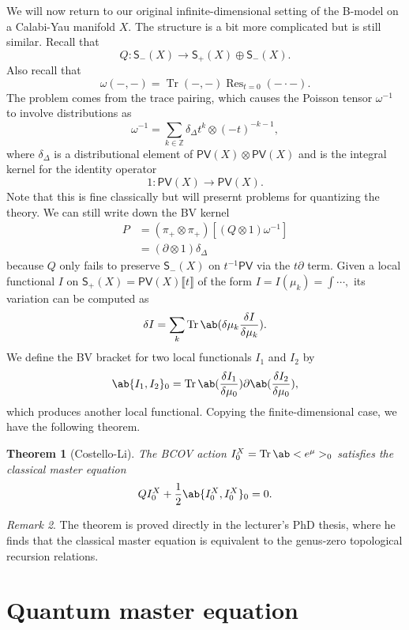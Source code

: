 \documentclass[article,10pt,oneside,oldfontcommands]{memoir}
\newtheorem{thm}{Theorem}[section]
\theoremstyle{definition}
\theoremstyle{remark}
\newtheorem{rmk}[thm]{Remark}
\theoremstyle{plain}
\theoremstyle{definition}
\theoremstyle{remark}
\newcommand{\Z}{\mathbb{Z}}
\newcommand{\on}[1]{\operatorname{#1}}
\newcommand{\ms}[1]{\mathsf{#1}}
\newcommand{\1}{\mathbf{1}}
\newcommand{\2}{\mathbf{2}}
\newcommand{\3}{\mathbf{3}}
\newcommand{\ps}[1]{\lBrack #1 \rBrack}
\begin{document}
We will now return to our original infinite-dimensional setting of the B-model on a Calabi-Yau manifold \(X\). The structure is a bit more complicated but is still similar. Recall that
\[ Q \colon \ms{S}_-(X) \to \ms{S}_+(X) \oplus \ms{S}_-(X). \]
Also recall that
\[ \omega(-,-) = \on{Tr}(-,-) \on{Res}_{t = 0} (- \cdot -). \]
The problem comes from the trace pairing, which causes the Poisson tensor \(\omega^{-1}\) to involve distributions as
\[ \omega^{-1} = \sum_{k \in \Z} \delta_{\Delta} t^k \otimes (-t)^{-k-1}, \]
where \(\delta_{\Delta}\) is a distributional element of \(\ms{PV}(X) \otimes \ms{PV}(X)\) and is the integral kernel for the identity operator
\[ 1 \colon \ms{PV}(X) \to \ms{PV}(X). \]
Note that this is fine classically but will presernt problems for quantizing the theory. We can still write down the BV kernel
\begin{align*}
    P &= (\pi_+ \otimes \pi_+) [(Q \otimes 1) \omega^{-1}] \\
    &= (\partial \otimes 1) \delta_{\Delta}
\end{align*}
because \(Q\) only fails to preserve \(\ms{S}_-(X)\) on \(t^{-1} \ms{PV}\) via the \(t \partial\) term. Given a local functional \(I\) on \(\ms{S}_+(X) = \ms{PV}(X) \ps{t}\) of the form \(I = I(\mu_k) = \int \cdots,\) its variation can be computed as
\begin{align*}
    \delta I = \sum_k \on{Tr} \ab(\delta \mu_k \fdv{I}{\mu_k}).
\end{align*}
We define the BV bracket for two local functionals \(I_1\) and \(I_2\) by
\[ \ab\{ I_1, I_2 \}_0 = \on{Tr} \ab(\fdv{I_1}{\mu_0}) \partial \ab(\fdv{I_2}{\mu_0}), \]
which produces another local functional. Copying the finite-dimensional case, we have the following theorem.

\begin{thm}[Costello-Li]
    The BCOV action \(I_0^X = \on{Tr}\ab<e^{\mu}>_0\) satisfies the \textit{classical master equation}
    \[ Q I_0^X + \frac{1}{2} \ab\{ I_0^X, I_0^X \}_0 = 0. \]
\end{thm}

\begin{rmk}
    The theorem is proved directly in the lecturer's PhD thesis, where he finds that the classical master equation is equivalent to the genus-zero topological recursion relations. 
\end{rmk}

\chapter{Quantum master equation}%
\label{cha:Quantum master equation}
\end{document}
